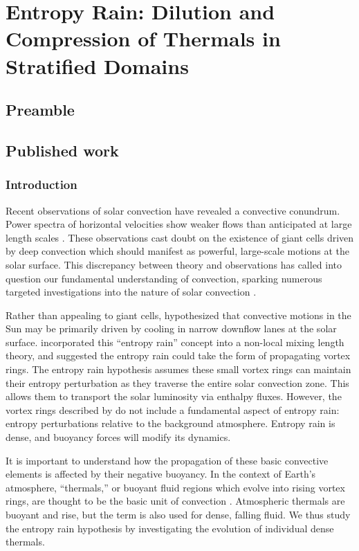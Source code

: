 \chapter{Entropy Rain: Dilution and Compression of Thermals in Stratified Domains}
\label{ch:alb19}

\section{Preamble}

\section{Published work}

\subsection{Introduction}
\label{sec:intro}
Recent observations of solar convection have revealed a convective conundrum.
Power spectra of horizontal velocities show weaker flows than anticipated at large length scales \cite{hanasoge&all2012, greer&all2015}.
These observations cast doubt on the existence of giant cells driven by deep convection which should manifest as powerful, large-scale motions at the solar surface. 
This discrepancy between theory and observations has called into question our fundamental understanding of convection, sparking numerous targeted investigations into the nature of solar convection  \cite{featherstone&hindman2016, omara&all2016, cossette&rast2016, kapyla&all2017, hotta2017}.

Rather than appealing to giant cells, \cite{spruit1997} hypothesized that convective motions in the Sun may be primarily driven by cooling in narrow downflow lanes at the solar surface.
\cite{brandenburg2016} incorporated this ``entropy rain'' concept into a non-local mixing length theory, and suggested the entropy rain could take the form of propagating vortex rings.
The entropy rain hypothesis assumes these small vortex rings can maintain their entropy perturbation as they traverse the entire solar convection zone.
This allows them to transport the solar luminosity via enthalpy fluxes.
However, the vortex rings described by \cite{brandenburg2016} do not include a fundamental aspect of entropy rain: entropy perturbations relative to the background atmosphere.
Entropy rain is dense, and buoyancy forces will modify its dynamics.

It is important to understand how the propagation of these basic convective elements is affected by their negative buoyancy. 
In the context of Earth's atmosphere, ``thermals,'' or buoyant fluid regions which evolve into rising vortex rings, are thought to be the basic unit of convection \cite[e.g.,][]{romps&all2015}. 
Atmospheric thermals are buoyant and rise, but the term is also used for dense, falling fluid.
We thus study the entropy rain hypothesis by investigating the evolution of individual dense thermals.

